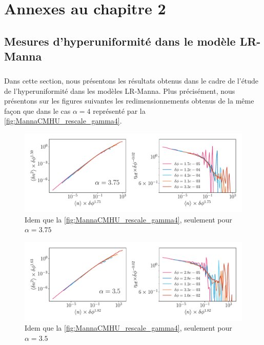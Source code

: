 \FloatBarrier

\section{Annexes au chapitre 2}

\subsection{Mesures d'hyperuniformité dans le modèle LR-Manna}

\label{sec:mesures_HU_Manna}

\subparagraph{}Dans cette section, nous présentons les résultats obtenus dans le cadre de l'étude de l'hyperuniformité dans les modèles LR-Manna. Plus précisément, nous présentons sur les figures suivantes les redimensionnements obtenus de la même façon que dans le cas $\alpha=4$ représenté par la \autoref{fig:MannaCMHU_rescale_gamma4}.

\begin{figure}[H]
	\centering
	\includegraphics[width=\textwidth]{Chapitre2/Figures/Hyperuniformity/RescaleHU_MannaCM_Gamma375.pdf}
	\caption{Idem que la \autoref{fig:MannaCMHU_rescale_gamma4}, seulement pour $\alpha=3.75$}
	\label{fig:MannaCMHU_rescale_gamma375}
\end{figure}

\begin{figure}[H]
	\centering
	\includegraphics[width=\textwidth]{Chapitre2/Figures/Hyperuniformity/RescaleHU_MannaCM_Gamma35.pdf}
	\caption{Idem que la \autoref{fig:MannaCMHU_rescale_gamma4}, seulement pour $\alpha=3.5$}
	\label{fig:MannaCMHU_rescale_gamma35}
\end{figure}

